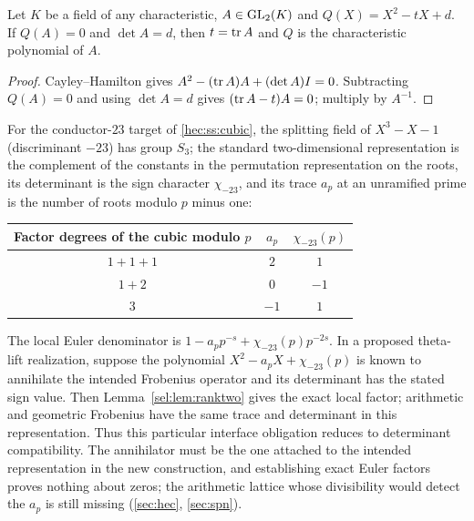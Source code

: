 \begin{lemma}\label{sel:lem:ranktwo}
Let $K$ be a field of any characteristic, $A\in\operatorname{GL}_2(K)$ and
$Q(X)=X^2-tX+d$. If $Q(A)=0$ and $\det A=d$, then $t=\operatorname{tr} A$ and $Q$ is the
characteristic polynomial of $A$.
\end{lemma}

\begin{proof}
Cayley--Hamilton gives $A^2-(\operatorname{tr} A)A+(\det A)I=0$. Subtracting $Q(A)=0$ and
using $\det A=d$ gives $(\operatorname{tr} A-t)A=0$; multiply by $A^{-1}$.
\end{proof}

For the conductor-$23$ target of \cref{hec:ss:cubic}, the splitting field of
$X^3-X-1$ (discriminant $-23$) has group $S_3$; the standard
two-dimensional representation is the complement of the constants in the
permutation representation on the roots, its determinant is the sign
character $\chi_{-23}$, and its trace $a_p$ at an unramified prime is the
number of roots modulo $p$ minus one:
\begin{center}
\begin{tabular}{@{}ccc@{}}
\toprule
Factor degrees of the cubic modulo $p$ & $a_p$ & $\chi_{-23}(p)$\\
\midrule
$1+1+1$ & $2$ & $1$\\
$1+2$ & $0$ & $-1$\\
$3$ & $-1$ & $1$\\
\bottomrule
\end{tabular}
\end{center}
The local Euler denominator is $1-a_pp^{-s}+\chi_{-23}(p)p^{-2s}$. In a
proposed theta-lift realization, suppose the polynomial
$X^2-a_pX+\chi_{-23}(p)$ is known to annihilate the intended Frobenius
operator and its determinant has the stated sign value. Then
Lemma~\ref{sel:lem:ranktwo} gives the exact local factor; arithmetic and
geometric Frobenius have the same trace and determinant in this
representation. Thus this particular interface obligation reduces to
determinant compatibility. The annihilator must be the one attached to the
intended representation in the new construction, and establishing exact
Euler factors proves nothing about zeros; the arithmetic lattice whose
divisibility would detect the $a_p$ is still missing (\cref{sec:hec},
\cref{sec:spn}).

